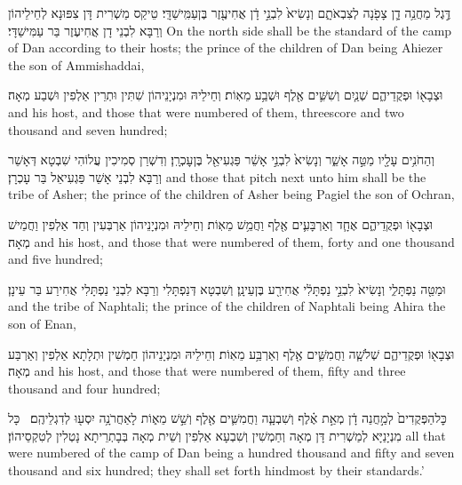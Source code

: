 {דֶּ֣גֶל מַחֲנֵ֥ה דָ֛ן צָפֹ֖נָה לְצִבְאֹתָ֑ם וְנָשִׂיא֙ לִבְנֵ֣י דָ֔ן אֲחִיעֶ֖זֶר בֶּן\maqqaf עַמִּֽישַׁדָּֽי׃}
{טֵיקַס מַשְׁרִית דָּן צִפּוּנָא לְחֵילֵיהוֹן וְרַבָּא לִבְנֵי דָן אֲחִיעֶזֶר בַּר עַמִּישַׁדָּי׃}
{On the north side shall be the standard of the camp of Dan according to their hosts; the prince of the children of Dan being Ahiezer the son of Ammishaddai,}{}

{וּצְבָא֖וֹ וּפְקֻדֵיהֶ֑ם שְׁנַ֧יִם וְשִׁשִּׁ֛ים אֶ֖לֶף וּשְׁבַ֥ע מֵאֽוֹת׃}
{וְחֵילֵיהּ וּמִנְיָנֵיהוֹן שִׁתִּין וּתְרֵין אַלְפִין וּשְׁבַע מְאָה׃}
{and his host, and those that were numbered of them, threescore and two thousand and seven hundred;}{}

{וְהַחֹנִ֥ים עָלָ֖יו מַטֵּ֣ה אָשֵׁ֑ר וְנָשִׂיא֙ לִבְנֵ֣י אָשֵׁ֔ר פַּגְעִיאֵ֖ל בֶּן\maqqaf עׇכְרָֽן׃}
{וְדִשְׁרַן סְמִיכִין עֲלוֹהִי שִׁבְטָא דְּאָשֵׁר וְרַבָּא לִבְנֵי אָשֵׁר פַּגְעִיאֵל בַּר עָכְרָן׃}
{and those that pitch next unto him shall be the tribe of Asher; the prince of the children of Asher being Pagiel the son of Ochran,}{}

{וּצְבָא֖וֹ וּפְקֻדֵיהֶ֑ם אֶחָ֧ד וְאַרְבָּעִ֛ים אֶ֖לֶף וַחֲמֵ֥שׁ מֵאֽוֹת׃}
{וְחֵילֵיהּ וּמִנְיָנֵיהוֹן אַרְבְּעִין וְחַד אַלְפִין וַחֲמֵישׁ מְאָה׃}
{and his host, and those that were numbered of them, forty and one thousand and five hundred;}{}

{וּמַטֵּ֖ה נַפְתָּלִ֑י וְנָשִׂיא֙ לִבְנֵ֣י נַפְתָּלִ֔י אֲחִירַ֖ע בֶּן\maqqaf עֵינָֽן׃}
{וְשִׁבְטָא דְּנַפְתָּלִי וְרַבָּא לִבְנֵי נַפְתָּלִי אֲחִירַע בַּר עֵינָן׃}
{and the tribe of Naphtali; the prince of the children of Naphtali being Ahira the son of Enan,}{}

{וּצְבָא֖וֹ וּפְקֻדֵיהֶ֑ם שְׁלֹשָׁ֧ה וַחֲמִשִּׁ֛ים אֶ֖לֶף וְאַרְבַּ֥ע מֵאֽוֹת׃}
{וְחֵילֵיהּ וּמִנְיָנֵיהוֹן חַמְשִׁין וּתְלָתָא אַלְפִין וְאַרְבַּע מְאָה׃}
{and his host, and those that were numbered of them, fifty and three thousand and four hundred;}{}

{כׇּל\maqqaf הַפְּקֻדִים֙ לְמַ֣חֲנֵה דָ֔ן מְאַ֣ת אֶ֗לֶף וְשִׁבְעָ֧ה וַחֲמִשִּׁ֛ים אֶ֖לֶף וְשֵׁ֣שׁ מֵא֑וֹת לָאַחֲרֹנָ֥ה יִסְע֖וּ לְדִגְלֵיהֶֽם׃ \petucha }
{כָּל מִנְיָנַיָּא לְמַשְׁרִית דָּן מְאָה וְחַמְשִׁין וְשִׁבְעָא אַלְפִין וְשֵׁית מְאָה בְּבָתְרֵיתָא נָטְלִין לְטִקְסֵיהוֹן׃}
{all that were numbered of the camp of Dan being a hundred thousand and fifty and seven thousand and six hundred; they shall set forth hindmost by their standards.’}{}


